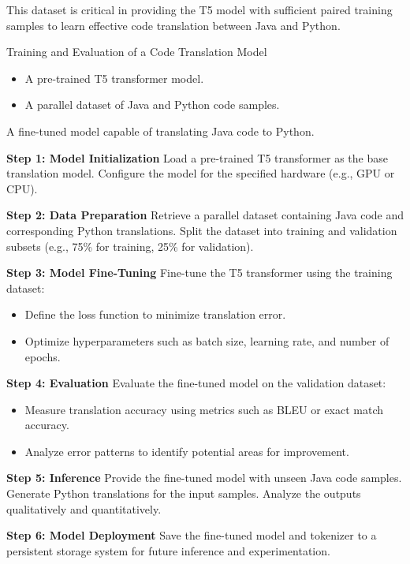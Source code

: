 \documentclass{dhbenelux}
\begin{document}
This dataset is critical in providing the T5 model with sufficient paired training samples to learn effective code translation between Java and Python.

\begin{algorithm}
\caption{Training and Evaluation of a Code Translation Model}
\label{alg:code_translation}
\begin{algorithmic}[1]
\Require 
\begin{itemize}
    \item A pre-trained T5 transformer model.
    \item A parallel dataset of Java and Python code samples.
\end{itemize}
\Ensure A fine-tuned model capable of translating Java code to Python.

\State \textbf{Step 1: Model Initialization}
\State Load a pre-trained T5 transformer as the base translation model.
\State Configure the model for the specified hardware (e.g., GPU or CPU).

\State \textbf{Step 2: Data Preparation}
\State Retrieve a parallel dataset containing Java code and corresponding Python translations.
\State Split the dataset into training and validation subsets (e.g., 75\% for training, 25\% for validation).

\State \textbf{Step 3: Model Fine-Tuning}
\State Fine-tune the T5 transformer using the training dataset:
\begin{itemize}
    \item Define the loss function to minimize translation error.
    \item Optimize hyperparameters such as batch size, learning rate, and number of epochs.
\end{itemize}

\State \textbf{Step 4: Evaluation}
\State Evaluate the fine-tuned model on the validation dataset:
\begin{itemize}
    \item Measure translation accuracy using metrics such as BLEU or exact match accuracy.
    \item Analyze error patterns to identify potential areas for improvement.
\end{itemize}

\State \textbf{Step 5: Inference}
\State Provide the fine-tuned model with unseen Java code samples.
\State Generate Python translations for the input samples.
\State Analyze the outputs qualitatively and quantitatively.

\State \textbf{Step 6: Model Deployment}
\State Save the fine-tuned model and tokenizer to a persistent storage system for future inference and experimentation.

\end{algorithmic}
\end{algorithm}



%
%
%
%
%
\end{document}

